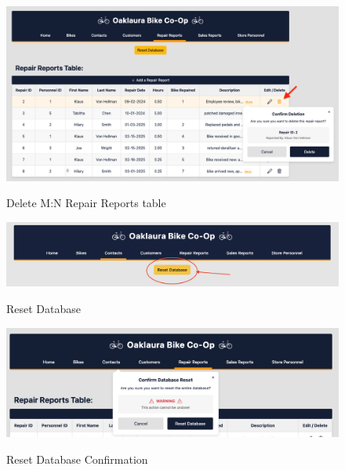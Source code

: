 \documentclass{article}
\begin{document}
\begin{figure}[H]
    \centering
    \caption{Delete M:N Repair Reports table}
    \vspace{0.2cm}
    \includegraphics[width=1.0\textwidth]{UI_screenshots/Delete_MN_RepairReports.png}
    \label{fig:Delete M:N Repair Reports table}
\end{figure}

\begin{figure}[H]
    \centering
    \caption{Reset Database}
    \vspace{0.2cm}
    \includegraphics[width=1.0\textwidth]{UI_screenshots/Reset_Database.png}
    \label{fig:Reset Database}
\end{figure}

\begin{figure}[H]
    \centering
    \caption{Reset Database Confirmation}
    \vspace{0.2cm}
    \includegraphics[width=1.0\textwidth]{UI_screenshots/Reset_Database_Confirmation.png}
    \label{fig:Reset Database Confirmation}
\end{figure}
\end{document}
